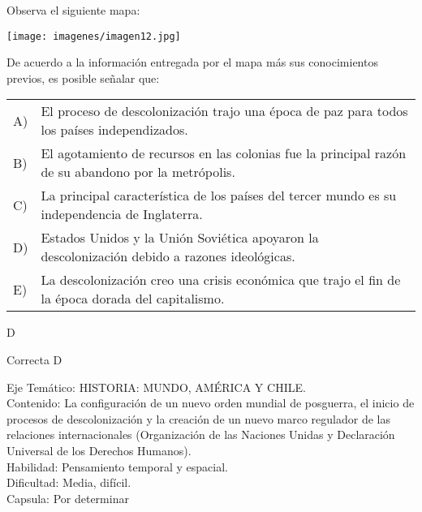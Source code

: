 \documentclass[letterpaper,11pt]{article}
\newcommand{\anchopregunta}{0.9\textwidth}
\begin{document}
\begin{enumerate}
\begin{minipage}{\anchopregunta}
\item Observa el siguiente mapa:
\begin{center}
\texttt{[image: imagenes/imagen12.jpg]}
\end{center}
De acuerdo a la información entregada por el mapa más sus conocimientos previos, es posible señalar que:
\begin{flushleft}\begin{tabular}{@{\hspace{-.001\textwidth}}l@{\hspace{2pt}}p{}}
A)& El proceso de descolonización trajo una época de paz para todos los países independizados.\\
B)& El agotamiento de recursos en las colonias fue la principal razón de su abandono por la metrópolis.\\
C)& La principal característica de los países del tercer mundo es su independencia de Inglaterra.\\
D)& Estados Unidos y la Unión Soviética apoyaron la descolonización debido a razones ideológicas. \\
E)& La descolonización creo una crisis económica que trajo el fin de la época dorada del capitalismo.\\ 
\end{tabular}\end{flushleft}%
\begin{key} D
\end{key} 
\begin{hint}
\end{hint}
\begin{answer} Correcta D \\
\end{answer}
\begin{info} %
\begin{flushleft}
Eje Temático: HISTORIA: MUNDO, AMÉRICA Y CHILE.\\
Contenido: La configuración de un nuevo orden mundial de posguerra, el inicio de procesos de descolonización y la creación de un nuevo marco regulador de las relaciones internacionales (Organización de las Naciones Unidas y Declaración Universal de los Derechos Humanos).\\
Habilidad: Pensamiento temporal y espacial.\\
Dificultad: Media, difícil.\\
Capsula: Por determinar \\
\end{flushleft} 
\end{info}
\end{minipage}\vfill$\;$ %


\end{enumerate}
\end{document}
